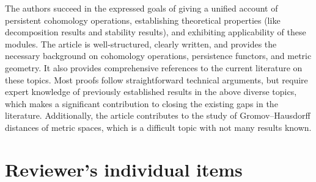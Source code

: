 \documentclass{amsart}
\begin{document}
	The authors succeed in the expressed goals of giving a unified account of persistent cohomology operations, establishing theoretical properties (like decomposition results and stability results), and exhibiting applicability of these modules.
	The article is well-structured, clearly written, and provides the necessary background on cohomology operations, persistence functors, and metric geometry.
	It also provides comprehensive references to the current literature on these topics.
	Most proofs follow straightforward technical arguments, but require expert knowledge of previously established results in the above diverse topics, which makes a significant contribution to closing the existing gaps in the literature.
	Additionally, the article contributes to the study of Gromov--Hausdorff distances of metric spaces, which is a difficult topic with not many results known.

	\section{Reviewer's individual items}
\end{document}
